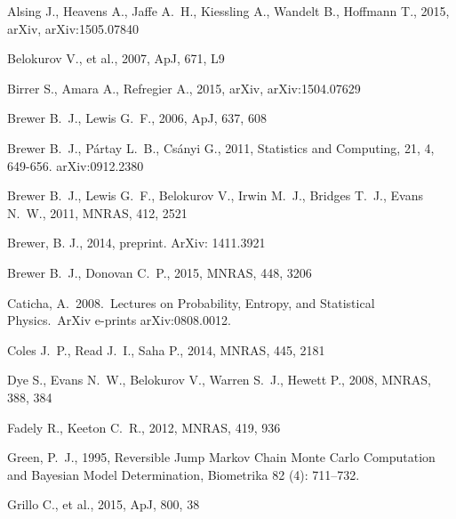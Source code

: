 \documentclass[useAMS,usenatbib]{mn2e}
\begin{document}
\begin{thebibliography}{99}
Alsing J., Heavens A., Jaffe A.~H., Kiessling A., Wandelt B., Hoffmann T., 
2015, arXiv, arXiv:1505.07840

 Belokurov V., et al., 2007, ApJ, 671, L9

 Birrer S., Amara A., Refregier A., 2015, arXiv, arXiv:1504.07629

 Brewer B.~J., Lewis G.~F., 2006, ApJ, 637, 608

 Brewer B.~J., P{\'a}rtay L.~B., Cs{\'a}nyi G., 2011,
Statistics and Computing, 21, 4, 649-656. arXiv:0912.2380

Brewer B.~J., Lewis G.~F., Belokurov V., Irwin M.~J., Bridges T.~J., Evans 
N.~W., 2011, MNRAS, 412, 2521

 Brewer, B. J., 2014,
preprint. ArXiv: 1411.3921

 Brewer B.~J., Donovan C.~P., 2015, MNRAS, 448, 3206 

 Caticha, A.\ 2008.\ Lectures 
on Probability, Entropy, and Statistical Physics.\ ArXiv e-prints 
arXiv:0808.0012. 

 Coles J.~P., Read J.~I., Saha P., 2014, MNRAS, 445, 2181

Dye S., Evans N.~W., Belokurov V., Warren S.~J., Hewett P., 2008, MNRAS, 
388, 384 

 Fadely R., Keeton C.~R., 2012, MNRAS, 419, 936

Green, P.~J., 1995, Reversible Jump Markov Chain Monte Carlo Computation and Bayesian Model Determination, Biometrika 82 (4): 711–732.

Grillo C., et al., 2015, ApJ, 800, 38 


\end{thebibliography}
\end{document}
